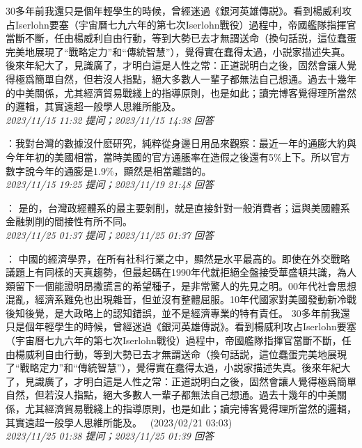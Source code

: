 \documentclass[twocolumn]{ctexart}
\begin{document}
30多年前我還只是個年輕學生的時候，曾經迷過《銀河英雄傳説》。看到楊威利攻占Iserlohn要塞（宇宙曆七九六年的第七次Iserlohn戰役）過程中，帝國艦隊指揮官當斷不斷，任由楊威利自由行動，等到大勢已去才無謂送命（換句話説，這位蠢蛋完美地展現了“戰略定力”和“傳統智慧”），覺得實在蠢得太過，小説家描述失真。後來年紀大了，見識廣了，才明白這是人性之常：正道説明白之後，固然會讓人覺得極爲簡單自然，但若沒人指點，絕大多數人一輩子都無法自己想通。過去十幾年的中美關係，尤其經濟貿易戰綫上的指導原則，也是如此；讀完博客覺得理所當然的邏輯，其實遠超一般學人思維所能及。
\\

\textit{\hfill\noindent\small 2023/11/15 11:32 提问；2023/11/15 14:38 回答}

：我對台灣的數據沒什麽研究，純粹從身邊日用品來觀察：最近一年的通膨大約與今年年初的美國相當，當時美國的官方通脹率在造假之後還有5\%上下。所以官方數字說今年的通膨是1.9\%，顯然是相當離譜的。
\\

\textit{\hfill\noindent\small 2023/11/15 19:25 提问；2023/11/19 21:48 回答}

：
是的，台灣政經體系的最主要剝削，就是直接針對一般消費者；這與美國體系金融剝削的間接性有所不同。
\\

\textit{\hfill\noindent\small 2023/11/25 01:37 提问；2023/11/25 01:37 回答}

：
中國的經濟學界，在所有社科行業之中，顯然是水平最高的。即使在外交戰略議題上有同樣的天真趨勢，但最起碼在1990年代就拒絕全盤接受華盛頓共識，為人類留下一個能證明昂撒謊言的希望種子，是非常驚人的先見之明。00年代社會思想混亂，經濟系難免也出現雜音，但並沒有整體屈服。10年代國家對美國發動新冷戰後知後覺，是大政略上的認知錯誤，並不是經濟專業的特有責任。 
30多年前我還只是個年輕學生的時候，曾經迷過《銀河英雄傳説》。看到楊威利攻占Iserlohn要塞（宇宙曆七九六年的第七次Iserlohn戰役）過程中，帝國艦隊指揮官當斷不斷，任由楊威利自由行動，等到大勢已去才無謂送命（換句話説，這位蠢蛋完美地展現了“戰略定力”和“傳統智慧”），覺得實在蠢得太過，小説家描述失真。後來年紀大了，見識廣了，才明白這是人性之常：正道説明白之後，固然會讓人覺得極爲簡單自然，但若沒人指點，絕大多數人一輩子都無法自己想通。過去十幾年的中美關係，尤其經濟貿易戰綫上的指導原則，也是如此；讀完博客覺得理所當然的邏輯，其實遠超一般學人思維所能及。 
 (2023/02/21 03:03)
\\

\textit{\hfill\noindent\small 2023/11/25 01:38 提问；2023/11/25 01:39 回答}
\end{document}
